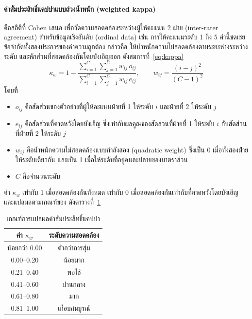 \paragraph{ค่าสัมประสิทธิ์แคปปาแบบถ่วงน้ำหนัก (weighted kappa)}
คือสถิติที่ Cohen เสนอ \citep{Cohen1968} เพื่อวัดความสอดคล้องระหว่างผู้ให้คะแนน 2 ฝ่าย (inter-rater agreement)
สำหรับข้อมูลเชิงอันดับ (ordinal data) เช่น การให้คะแนนระดับ 1 ถึง 5 ค่านี้ชดเชยข้อจำกัดทั้งสองประการของค่าความถูกต้อง
กล่าวคือ ให้น้ำหนักความไม่สอดคล้องตามระยะห่างระหว่างระดับ และหักส่วนที่สอดคล้องกันโดยบังเอิญออก ดังสมการที่~\eqref{eq:kappa}
\begin{equation}
\kappa_w = 1 - \frac{\sum_{i=1}^{C}\sum_{j=1}^{C} w_{ij}\, o_{ij}}{\sum_{i=1}^{C}\sum_{j=1}^{C} w_{ij}\, e_{ij}}, \qquad w_{ij} = \frac{(i-j)^2}{(C-1)^2}
\label{eq:kappa}
\end{equation}
โดยที่
\begin{itemize}[nosep, before=\vspace{-0.5\parskip}]
    \item $o_{ij}$ คือสัดส่วนของตัวอย่างที่ผู้ให้คะแนนฝ่ายที่ 1 ให้ระดับ $i$ และฝ่ายที่ 2 ให้ระดับ $j$
    \item $e_{ij}$ คือสัดส่วนที่คาดหวังโดยบังเอิญ ซึ่งเท่ากับผลคูณของสัดส่วนที่ฝ่ายที่ 1 ให้ระดับ $i$ กับสัดส่วนที่ฝ่ายที่ 2 ให้ระดับ $j$
    \item $w_{ij}$ คือน้ำหนักความไม่สอดคล้องแบบกำลังสอง (quadratic weight) ซึ่งเป็น 0 เมื่อทั้งสองฝ่ายให้ระดับเดียวกัน และเป็น 1 เมื่อให้ระดับที่อยู่คนละปลายของมาตราส่วน
    \item $C$ คือจำนวนระดับ
\end{itemize}
\vspace{-\parskip}
ค่า $\kappa_w$ เท่ากับ 1 เมื่อสอดคล้องกันทั้งหมด เท่ากับ 0 เมื่อสอดคล้องกันเท่ากับที่คาดหวังโดยบังเอิญ
และแปลผลตามเกณฑ์ของ \citet{Landis1977} ดังตารางที่~\ref{tab:kappa-interp}

\begin{table}[htbp]
\centering
\begin{tabular}{cc}
\hline
\textbf{ค่า $\kappa_w$} & \textbf{ระดับความสอดคล้อง} \\
\hline
น้อยกว่า 0.00 & ต่ำกว่าการสุ่ม \\
0.00--0.20 & น้อยมาก \\
0.21--0.40 & พอใช้ \\
0.41--0.60 & ปานกลาง \\
0.61--0.80 & มาก \\
0.81--1.00 & เกือบสมบูรณ์ \\
\hline
\end{tabular}
\caption{เกณฑ์การแปลผลค่าสัมประสิทธิ์แคปปา \citep{Landis1977}}
\label{tab:kappa-interp}
\end{table}

